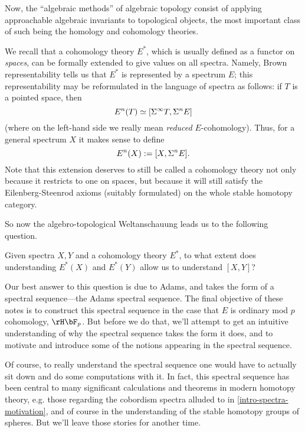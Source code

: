 Now, the ``algebraic methods'' of algebraic topology consist of applying approachable algebraic invariants to topological objects, the most important class of such being the homology and cohomology theories.

\begin{remark}
  \label{intro-spectra-cohomology}
  We recall that a cohomology theory $E^*$, which is usually defined as a functor on \emph{spaces}, can be formally extended to give values on all spectra. Namely, Brown representability tells us that $E^*$ is represented by a spectrum $E$; this representability may be reformulated in the language of spectra as follows: if $T$ is a pointed space, then
  \[
    E^n(T) \simeq [\Sigma^\infty T, \Sigma^n E]
  \]
  (where on the left-hand side we really mean \emph{reduced} $E$-cohomology). Thus, for a general spectrum $X$ it makes sense to define
  \[
    E^n(X) \mathrel{:=} [X, \Sigma^n E].
  \]
  Note that this extension deserves to still be called a cohomology theory not only because it restricts to one on spaces, but because it will still satisfy the Eilenberg-Steenrod axioms (suitably formulated) on the whole stable homotopy category.
\end{remark}

So now the algebro-topological Weltanschauung leads us to the following question.

\begin{question}
  \label{intro-q}
  Given spectra $X, Y$ and a cohomology theory $E^*$, to what extent does understanding $E^*(X)$ and $E^*(Y)$ allow us to understand $[X,Y]$?
\end{question}

Our best answer to this question is due to Adams, and takes the form of a spectral sequence---the Adams spectral sequence. The final objective of these notes is to construct this spectral sequence in the case that $E$ is ordinary mod $p$ cohomology, $\HFp$. But before we do that, we'll attempt to get an intuitive understanding of why the spectral sequence takes the form it does, and to motivate and introduce some of the notions appearing in the spectral sequence.

Of course, to really understand the spectral sequence one would have to actually sit down and do some computations with it. In fact, this spectral sequence has been central to many significant calculations and theorems in modern homotopy theory, e.g. those regarding the cobordism spectra alluded to in \cref{intro-spectra-motivation}, and of course in the understanding of the stable homotopy groups of spheres. But we'll leave those stories for another time.

